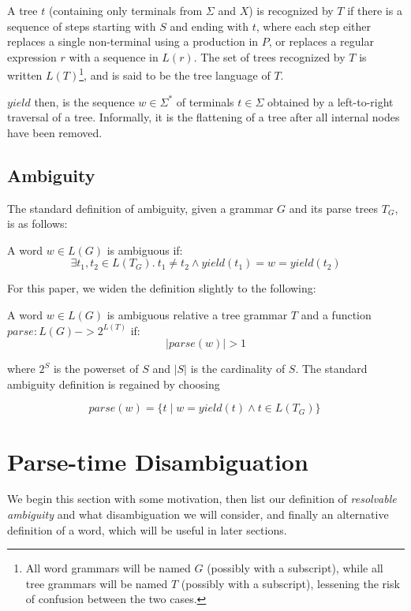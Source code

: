 \documentclass[acmsmall,review,anonymous]{acmart}\settopmatter{printfolios=true,printccs=false,printacmref=false}
\newcommand{\T}{\Sigma} %
\newcommand{\yield}{\mathit{yield}} %
\newcommand{\parse}{\mathit{parse}} %
\begin{document}
\noindent A tree $t$ (containing only terminals from $\T$ and $X$) is recognized by $T$ if there is a sequence of steps starting with $S$ and ending with $t$, where each step either replaces a single non-terminal using a production in $P$, or replaces a regular expression $r$ with a sequence in $L(r)$. The set of trees recognized by $T$ is written $L(T)$\footnote{All word grammars will be named $G$ (possibly with a subscript), while all tree grammars will be named $T$ (possibly with a subscript), lessening the risk of confusion between the two cases.}, and is said to be the tree language of $T$.

$\yield$ then, is the sequence $w \in \T^{*}$ of terminals $t \in \T$ obtained by a left-to-right traversal of a tree. Informally, it is the flattening of a tree after all internal nodes have been removed.

\subsection{Ambiguity} \label{sec:preliminaries-ambiguity}

The standard definition of ambiguity, given a grammar $G$ and its parse trees $T_G$, is as follows:

\begin{definition}
A word $w \in L(G)$ is ambiguous if:
  \[ \exists t_1, t_2 \in L(T_G).\ t_1 \neq t_2 \land \yield(t_1) = w = \yield(t_2) \]
\end{definition}

\noindent For this paper, we widen the definition slightly to the following:

\begin{definition}
  A word $w \in L(G)$ is ambiguous relative a tree grammar $T$ and a function $\parse : L(G) -> 2^{L(T)}$ if:
  \[ |\parse(w)| > 1 \]
\end{definition}

\noindent where $2^S$ is the powerset of $S$ and $|S|$ is the cardinality of $S$. The standard ambiguity definition is regained by choosing

\[ \parse(w) = \{ t \mid w = \yield(t) \land t \in L(T_G) \}\ \]

\section{Parse-time Disambiguation}

We begin this section with some motivation, then list our definition of \emph{resolvable ambiguity} and what disambiguation we will consider, and finally an alternative definition of a word, which will be useful in later sections.
\end{document}
